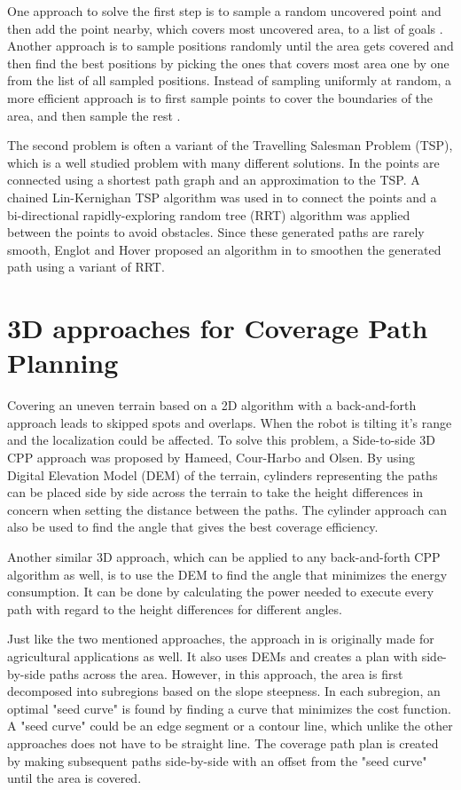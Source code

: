 One approach to solve the first step is to sample a random uncovered point and then add the point nearby, which covers most uncovered area, to a list of goals \cite{844726}. Another approach is to sample positions randomly until the area gets covered and then find the best positions by picking the ones that covers most area one by one from the list of all sampled positions. Instead of sampling uniformly at random, a more efficient approach is to first sample points to cover the boundaries of the area, and then sample the rest \cite{Gonzalez}. 

The second problem is often a variant of the Travelling Salesman Problem (TSP), which is a well studied problem with many different solutions. In \cite{844726} the points are connected using a shortest path graph and an approximation to the TSP. A chained Lin-Kernighan TSP algorithm \cite{applegate2000chained} was used in \cite{6386126} to connect the points and a bi-directional rapidly-exploring random tree (RRT)  algorithm \cite{rrt} was applied between the points to avoid obstacles. Since these generated paths are rarely smooth, Englot and Hover proposed an algorithm in \cite{3drandomsample} to smoothen the generated path using a variant of RRT.

\section{3D approaches for Coverage Path Planning}

Covering an uneven terrain based on a 2D algorithm with a back-and-forth approach leads to skipped spots and overlaps. When the robot is tilting it's range and the localization could be affected. To solve this problem, a Side-to-side 3D CPP approach was proposed by Hameed, Cour-Harbo and Olsen. By using Digital Elevation Model (DEM) of the terrain, cylinders representing the paths can be placed side by side across the terrain to take the height differences in concern when setting the distance between the paths. The cylinder approach can also be used to find the angle that gives the best coverage efficiency. \cite{HAMEED201636}

Another similar 3D approach, which can be applied to any back-and-forth CPP algorithm as well, is to use the DEM to find the angle that minimizes the energy consumption. It can be done by calculating the power needed to execute every path with regard to the height differences for different angles. \cite{IntelligentHameed}

Just like the two mentioned approaches, the approach in \cite{juntangarablefarming} is originally made for agricultural applications as well. It also uses DEMs and creates a plan with side-by-side paths across the area. However, in this approach, the area is first decomposed into subregions based on the slope steepness. In each subregion, an optimal "seed curve" is found by finding a curve that minimizes the cost function. A "seed curve" could be an edge segment or a contour line, which unlike the other approaches does not have to be straight line. The coverage path plan is created by making subsequent paths side-by-side with an offset from the "seed curve" until the area is covered.

